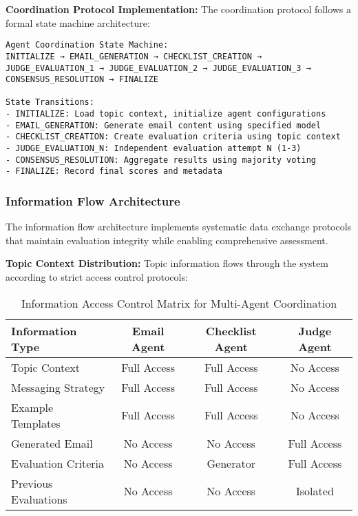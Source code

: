 \textbf{Coordination Protocol Implementation:}
The coordination protocol follows a formal state machine architecture:

\begin{verbatim}
Agent Coordination State Machine:
INITIALIZE → EMAIL_GENERATION → CHECKLIST_CREATION → 
JUDGE_EVALUATION_1 → JUDGE_EVALUATION_2 → JUDGE_EVALUATION_3 → 
CONSENSUS_RESOLUTION → FINALIZE

State Transitions:
- INITIALIZE: Load topic context, initialize agent configurations
- EMAIL_GENERATION: Generate email content using specified model
- CHECKLIST_CREATION: Create evaluation criteria using topic context
- JUDGE_EVALUATION_N: Independent evaluation attempt N (1-3)
- CONSENSUS_RESOLUTION: Aggregate results using majority voting
- FINALIZE: Record final scores and metadata
\end{verbatim}

\subsubsection{Information Flow Architecture}

The information flow architecture implements systematic data exchange protocols that maintain evaluation integrity while enabling comprehensive assessment.

\textbf{Topic Context Distribution:}
Topic information flows through the system according to strict access control protocols:

\begin{table}[H]
\centering
\caption[Agent Information Access Matrix]{Information Access Control Matrix for Multi-Agent Coordination}
\label{tab:agent-information-access}
\begin{tabular}{lccc}
\toprule
\textbf{Information Type} & \textbf{Email Agent} & \textbf{Checklist Agent} & \textbf{Judge Agent} \\
\midrule
Topic Context & Full Access & Full Access & No Access \\
Messaging Strategy & Full Access & Full Access & No Access \\
Example Templates & Full Access & Full Access & No Access \\
Generated Email & No Access & No Access & Full Access \\
Evaluation Criteria & No Access & Generator & Full Access \\
Previous Evaluations & No Access & No Access & Isolated \\
\bottomrule
\end{tabular}
\end{table}

